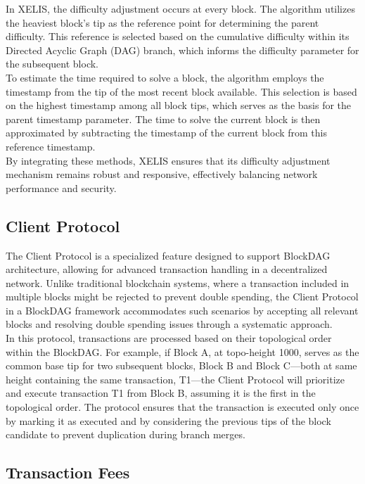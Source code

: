 \documentclass[10pt,a4paper,twocolumn]{article}
\begin{document}
In XELIS, the difficulty adjustment occurs at every block. The algorithm utilizes the heaviest block’s tip as the reference point for determining the parent difficulty. This reference is selected based on the cumulative difficulty within its Directed Acyclic Graph (DAG) branch, which informs the difficulty parameter for the subsequent block.\\

To estimate the time required to solve a block, the algorithm employs the timestamp from the tip of the most recent block available. This selection is based on the highest timestamp among all block tips, which serves as the basis for the parent timestamp parameter. The time to solve the current block is then approximated by subtracting the timestamp of the current block from this reference timestamp.\\

By integrating these methods, XELIS ensures that its difficulty adjustment mechanism remains robust and responsive, effectively balancing network performance and security.

\subsection{Client Protocol}

The Client Protocol is a specialized feature designed to support BlockDAG architecture, allowing for advanced transaction handling in a decentralized network. Unlike traditional blockchain systems, where a transaction included in multiple blocks might be rejected to prevent double spending, the Client Protocol in a BlockDAG framework accommodates such scenarios by accepting all relevant blocks and resolving double spending issues through a systematic approach.\\

In this protocol, transactions are processed based on their topological order within the BlockDAG. For example, if Block A, at topo-height 1000, serves as the common base tip for two subsequent blocks, Block B and Block C—both at same height containing the same transaction, T1—the Client Protocol will prioritize and execute transaction T1 from Block B, assuming it is the first in the topological order. The protocol ensures that the transaction is executed only once by marking it as executed and by considering the previous tips of the block candidate to prevent duplication during branch merges.\\

\subsection{Transaction Fees}
\end{document}

